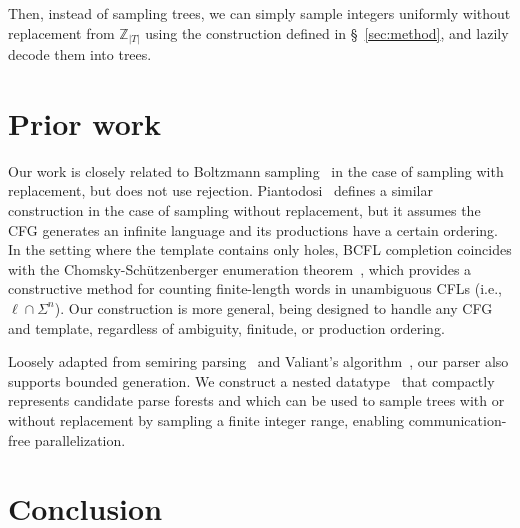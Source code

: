 \documentclass[sigplan,nonacm]{acmart}\settopmatter{printfolios=false,printccs=false,printacmref=false}
\begin{document}
Then, instead of sampling trees, we can simply sample integers uniformly without replacement from $\mathbb{Z}_{|T|}$ using the construction defined in \S~\ref{sec:method}, and lazily decode them into trees.

%
%

  \section{Prior work}

  Our work is closely related to Boltzmann sampling~\cite{duchon2004boltzmann} in the case of sampling with replacement, but does not use rejection. Piantodosi~\cite{piantadosi2023enumerate} defines a similar construction in the case of sampling without replacement, but it assumes the CFG generates an infinite language and its productions have a certain ordering. In the setting where the template contains only holes, BCFL completion coincides with the Chomsky-Sch\"utzenberger enumeration theorem~\cite{panholzer2005grobner}, which provides a constructive method for counting finite-length words in unambiguous CFLs (i.e., $\ell\cap\Sigma^n$). Our construction is more general, being designed to handle any CFG and template, regardless of ambiguity, finitude, or production ordering.

  Loosely adapted from semiring parsing~\cite{goodman1999semiring} and Valiant's algorithm~\cite{valiant1975general}, our parser also supports bounded generation. We construct a nested datatype~\cite{bird1998nested} that compactly represents candidate parse forests and which can be used to sample trees with or without replacement by sampling a finite integer range, enabling communication-free parallelization. %

  \section{Conclusion}
\end{document}
